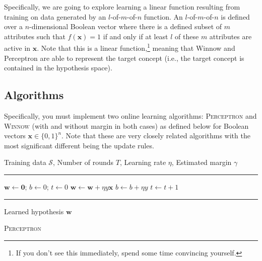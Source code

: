 \documentclass[12pt,letterpaper]{article}
\begin{document}
Specifically, we are going to explore learning a linear function resulting from training on data generated by an $l$-of-$m$-of-$n$ function.  An $l$-of-$m$-of-$n$ is defined over a $n$-dimensional Boolean vector where there is a defined subset of $m$ attributes such that $f(\mathbf{x}) = 1$ if and only if at least $l$ of these $m$ attributes are active in $\mathbf{x}$.  Note that this is a linear function,\footnote{If you don't see this immediately, spend some time convincing yourself.} meaning that Winnow and Perceptron are able to represent the target concept (i.e., the target concept is contained in the hypothesis space).

\subsection*{Algorithms}

Specifically, you must implement two online learning algorithms: \textsc{Perceptron} and \textsc{Winnow} (with and without margin in both cases) as defined below for Boolean vectors $\mathbf{x} \in \{0,1\}^n$.  Note that these are very closely related algorithms with the most significant different being the update rules.

\begin{algorithm}[h]
\begin{algorithmic}
    Training data $\mathcal{S}$, Number of rounds $T$, Learning rate $\eta$, Estimated margin $\gamma$
   \vspace{0.5em}
   \hrule
   \vspace{0.5em}
   \STATE $\mathbf{w} \leftarrow \mathbf{0}$; $b \leftarrow 0$; $t \leftarrow 0$
            \STATE $\mathbf{w} \leftarrow \mathbf{w} + \eta y \mathbf{x}$
            \STATE $b \leftarrow b + \eta y$
         \ENDIF
      \ENDFOR
      \STATE $t \leftarrow t + 1$
   \ENDWHILE
   \vspace{0.5em}
   \hrule
   \vspace{0.5em}
    Learned hypothesis $\mathbf{w}$ 
\caption{\textsc{Perceptron}}
\end{algorithmic}
\end{algorithm}
\end{document}

